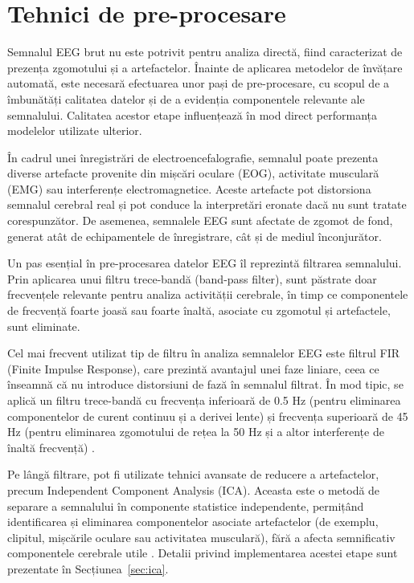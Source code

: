 \documentclass[12pt,a4paper]{report}
\theoremstyle{definition}
\theoremstyle{remark}
\begin{document}
\section{Tehnici de pre-procesare}
\label{sec:preprocesare}

Semnalul EEG brut nu este potrivit pentru analiza directă, fiind caracterizat de prezența zgomotului și a artefactelor. Înainte de aplicarea metodelor de învățare automată, este necesară efectuarea unor pași de pre-procesare, cu scopul de a îmbunătăți calitatea datelor și de a evidenția componentele relevante ale semnalului. Calitatea acestor etape influențează în mod direct performanța modelelor utilizate ulterior.

În cadrul unei înregistrări de electroencefalografie, semnalul poate prezenta diverse artefacte provenite din mișcări oculare (EOG), activitate musculară (EMG) sau interferențe electromagnetice. Aceste artefacte pot distorsiona semnalul cerebral real și pot conduce la interpretări eronate dacă nu sunt tratate corespunzător. De asemenea, semnalele EEG sunt afectate de zgomot de fond, generat atât de echipamentele de înregistrare, cât și de mediul înconjurător.

Un pas esențial în pre-procesarea datelor EEG îl reprezintă filtrarea semnalului. Prin aplicarea unui filtru trece-bandă (band-pass filter), sunt păstrate doar frecvențele relevante pentru analiza activității cerebrale, în timp ce componentele de frecvență foarte joasă sau foarte înaltă, asociate cu zgomotul și artefactele, sunt eliminate.

Cel mai frecvent utilizat tip de filtru în analiza semnalelor EEG este filtrul FIR (Finite Impulse Response), care prezintă avantajul unei faze liniare, ceea ce înseamnă că nu introduce distorsiuni de fază în semnalul filtrat. În mod tipic, se aplică un filtru trece-bandă cu frecvența inferioară de 0.5 Hz (pentru eliminarea componentelor de curent continuu și a derivei lente) și frecvența superioară de 45 Hz (pentru eliminarea zgomotului de rețea la 50 Hz și a altor interferențe de înaltă frecvență) \cite{awais2024graphical,rahman2025advancement}.

Pe lângă filtrare, pot fi utilizate tehnici avansate de reducere a artefactelor, precum Independent Component Analysis (ICA). Aceasta este o metodă de separare a semnalului în componente statistice independente, permițând identificarea și eliminarea componentelor asociate artefactelor (de exemplu, clipitul, mișcările oculare sau activitatea musculară), fără a afecta semnificativ componentele cerebrale utile \cite{awais2024graphical,rahman2025advancement}. Detalii privind implementarea acestei etape sunt prezentate în Secțiunea~\ref{sec:ica}.
\end{document}

